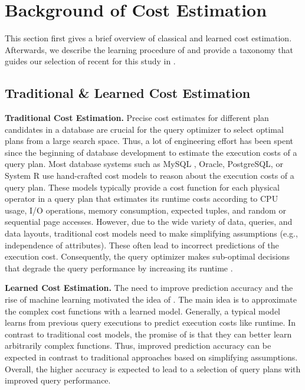 \section{Background of Cost Estimation} \label{sec:background}
This section first gives a brief overview of classical and learned cost estimation. 
Afterwards, we describe the learning procedure of \lcms and provide a taxonomy that guides our selection of recent \lcms for this study in .

\subsection{Traditional \& Learned Cost Estimation}
\textbf{Traditional Cost Estimation.} 
Precise cost estimates for different plan candidates in a database are crucial for the query optimizer to select optimal plans from a large search space.
Thus, a lot of engineering effort has been spent since the beginning of database development to estimate the execution costs of a query plan.
Most database systems such as MySQL \cite{widenius2002}, Oracle, PostgreSQL, or System R \cite{astrahan1976} use hand-crafted cost models to reason about the execution costs of a query plan.
These models typically provide a cost function for each physical operator in a query plan that estimates its runtime costs according to CPU usage, I/O operations, memory consumption, expected tuples, and random or sequential page accesses.
However, due to the wide variety of data, queries, and data layouts, traditional cost models need to make simplifying assumptions (e.g., independence of attributes).
These often lead to incorrect predictions of the execution cost. 
Consequently, the query optimizer makes sub-optimal decisions that degrade the query performance by increasing its runtime \cite{leis_how_2015}.

\noindent\textbf{Learned Cost Estimation.}
The need to improve prediction accuracy and the rise of machine learning motivated the idea of \lcms. 
The main idea is to approximate the complex cost functions with a learned model.
Generally, a typical model learns from previous query executions to predict execution costs like runtime.
In contrast to traditional cost models, the promise of \lcms is that they can better learn arbitrarily complex functions.
Thus, improved prediction accuracy can be expected in contrast to traditional approaches based on simplifying assumptions.
Overall, the higher accuracy is expected to lead to a selection of query plans with improved query performance.

